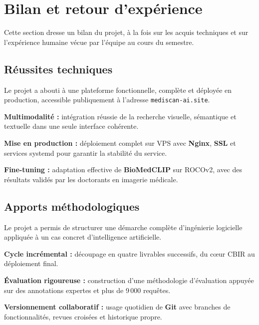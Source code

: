 \documentclass[12pt,a4paper]{article}
\newcommand{\NewMajorPart}{\clearpage}
\begin{document}
\NewMajorPart
\section{Bilan et retour d'expérience}

Cette section dresse un bilan du projet, à la fois sur les acquis techniques
et sur l'expérience humaine vécue par l'équipe au cours du semestre.

\vspace{0.15cm}

\subsection{Réussites techniques}

Le projet a abouti à une plateforme fonctionnelle, complète et déployée en production,
accessible publiquement à l'adresse \texttt{mediscan-ai.site}.
\begin{sq}
  \item \textbf{Multimodalité :} intégration réussie de la recherche visuelle, sémantique et textuelle dans une seule interface cohérente.
  \item \textbf{Mise en production :} déploiement complet sur VPS avec \textbf{Nginx}, \textbf{SSL} et services systemd pour garantir la stabilité du service.
  \item \textbf{Fine-tuning :} adaptation effective de \textbf{BioMedCLIP} sur ROCOv2, avec des résultats validés par les doctorants en imagerie médicale.
\end{sq}

\vspace{0.15cm}

\subsection{Apports méthodologiques}

Le projet a permis de structurer une démarche complète d'ingénierie logicielle
appliquée à un cas concret d'intelligence artificielle.
\begin{sq}
  \item \textbf{Cycle incrémental :} découpage en quatre livrables successifs, du cœur CBIR au déploiement final.
  \item \textbf{Évaluation rigoureuse :} construction d'une méthodologie d'évaluation appuyée sur des annotations expertes et plus de 9\,000 requêtes.
  \item \textbf{Versionnement collaboratif :} usage quotidien de \textbf{Git} avec branches de fonctionnalités, revues croisées et historique propre.
\end{sq}
\end{document}
